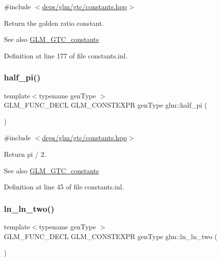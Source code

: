 {\ttfamily \#include $<$\hyperlink{constants_8hpp}{deps/glm/gtc/constants.\+hpp}$>$}

Return the golden ratio constant. \begin{DoxySeeAlso}{See also}
\hyperlink{group__gtc__constants}{G\+L\+M\+\_\+\+G\+T\+C\+\_\+constants} 
\end{DoxySeeAlso}


Definition at line 177 of file constants.\+inl.

\mbox{\label{group__gtc__constants_ga0c36b41d462e45641faf7d7938948bac}} 
\subsubsection{\texorpdfstring{half\+\_\+pi()}{half\_pi()}}
{\footnotesize\ttfamily template$<$typename gen\+Type $>$ \\
G\+L\+M\+\_\+\+F\+U\+N\+C\+\_\+\+D\+E\+CL G\+L\+M\+\_\+\+C\+O\+N\+S\+T\+E\+X\+PR gen\+Type glm\+::half\+\_\+pi (\begin{DoxyParamCaption}{ }\end{DoxyParamCaption})}



{\ttfamily \#include $<$\hyperlink{constants_8hpp}{deps/glm/gtc/constants.\+hpp}$>$}

Return pi / 2. \begin{DoxySeeAlso}{See also}
\hyperlink{group__gtc__constants}{G\+L\+M\+\_\+\+G\+T\+C\+\_\+constants} 
\end{DoxySeeAlso}


Definition at line 45 of file constants.\+inl.

\mbox{\label{group__gtc__constants_gaca94292c839ed31a405ab7a81ae7e850}} 
\subsubsection{\texorpdfstring{ln\+\_\+ln\+\_\+two()}{ln\_ln\_two()}}
{\footnotesize\ttfamily template$<$typename gen\+Type $>$ \\
G\+L\+M\+\_\+\+F\+U\+N\+C\+\_\+\+D\+E\+CL G\+L\+M\+\_\+\+C\+O\+N\+S\+T\+E\+X\+PR gen\+Type glm\+::ln\+\_\+ln\+\_\+two (\begin{DoxyParamCaption}{ }\end{DoxyParamCaption})}



